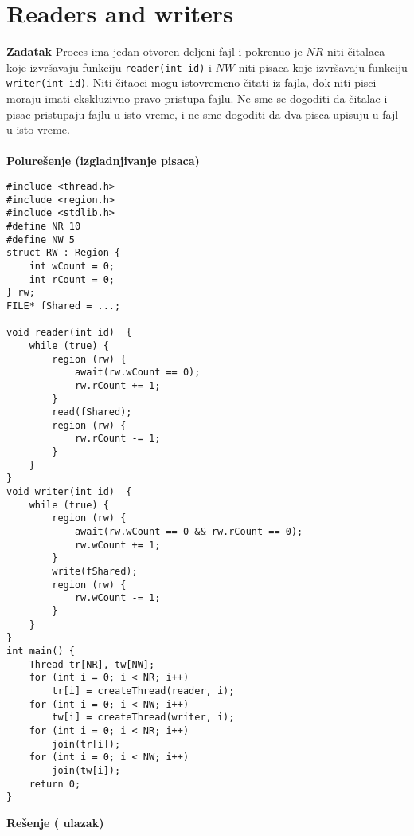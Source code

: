 \clearpage
\section{\latin Readers and writers}
\textbf{\large Zadatak} Proces ima jedan otvoren deljeni fajl i pokrenuo je $NR$ niti \v{c}italaca koje izvr\v{s}avaju funkciju \texttt{reader(int id)} i $NW$ niti pisaca koje izvr\v{s}avaju funkciju \texttt{writer(int id)}. Niti \v{c}itaoci mogu istovremeno \v{c}itati iz fajla, dok niti pisci moraju imati ekskluzivno pravo pristupa fajlu. Ne sme se dogoditi da \v{c}italac i pisac pristupaju fajlu u isto vreme, i ne sme dogoditi da dva pisca upisuju u fajl u isto vreme.
\\\\
\textbf{\large Polure\v{s}enje (izgladnjivanje pisaca)}
\begin{lstlisting}
#include <thread.h>
#include <region.h>
#include <stdlib.h>
#define NR 10
#define NW 5
struct RW : Region {
    int wCount = 0;
    int rCount = 0;
} rw;
FILE* fShared = ...;

void reader(int id)  {
    while (true) {
        region (rw) {
            await(rw.wCount == 0);
            rw.rCount += 1;
        }
        read(fShared);
		region (rw) {
            rw.rCount -= 1;
        }
    }
}
void writer(int id)  {
    while (true) {
        region (rw) {
            await(rw.wCount == 0 && rw.rCount == 0);
            rw.wCount += 1;
        }
        write(fShared);
		region (rw) {
            rw.wCount -= 1;
        }
    }
}
int main() {
    Thread tr[NR], tw[NW];
    for (int i = 0; i < NR; i++) 
        tr[i] = createThread(reader, i);
    for (int i = 0; i < NW; i++) 
        tw[i] = createThread(writer, i);
    for (int i = 0; i < NR; i++) 
        join(tr[i]);
    for (int i = 0; i < NW; i++) 
        join(tw[i]);
    return 0;
}

\end{lstlisting}
\clearpage
\textbf{\large Re\v{s}enje ( ulazak)}\\
